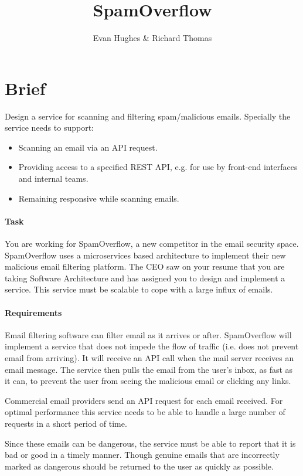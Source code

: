 \documentclass{csse4400}
\title{SpamOverflow}
\author{Evan Hughes \& Richard Thomas}
\date{\week[tutorial]{11}}
\begin{document}
\maketitle


\section{Brief}

Design a service for scanning and filtering spam/malicious emails.
Specially the service needs to support:
\begin{itemize}
    \item Scanning an email via an API request.
    \item Providing access to a specified REST API, e.g. for use by front-end interfaces and internal teams.
    \item Remaining responsive while scanning emails.
\end{itemize}

\paragraph{Task}
You are working for SpamOverflow,
a new competitor in the email security space.
Spam\-Overflow uses a microservices based architecture to implement their new malicious email filtering platform.
The CEO saw on your resume that you are taking Software Architecture and has assigned you to design and implement a service.
This service must be scalable to cope with a large influx of emails.

\paragraph{Requirements}
Email filtering software can filter email as it arrives or after.
SpamOverflow will implement a service that does not impede the flow of traffic (i.e. does not prevent email from arriving).
It will receive an API call when the mail server receives an email message.
The service then pulls the email from the user's inbox, as fast as it can,
to prevent the user from seeing the malicious email or clicking any links.

Commercial email providers send an API request for each email received.
For optimal performance this service needs to be able to handle a large number of requests in a short period of time.

Since these emails can be dangerous, the service must be able to report that it is bad or good in a timely manner.
Though genuine emails that are incorrectly marked as dangerous should be returned to the user as quickly as possible.
\end{document}
